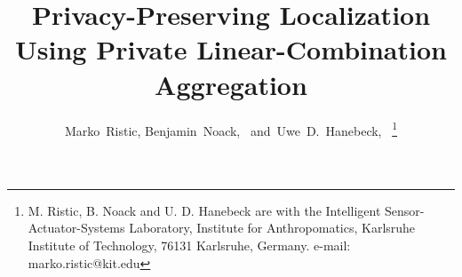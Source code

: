 \documentclass[10pt,letterpaper,oneside,twocolumn,journal]{IEEEtran}
\theoremstyle{definition}
\theoremstyle{definition}
\theoremstyle{remark}
\begin{document}
%
\title{Privacy-Preserving Localization Using Private Linear-Combination Aggregation}
%
%
\author{Marko~Ristic,
        Benjamin~Noack,~
        and~Uwe~D.~Hanebeck,~%
\thanks{M. Ristic, B. Noack and U. D. Hanebeck are with the Intelligent Sensor-Actuator-Systems Laboratory, Institute for Anthropomatics, Karlsruhe Institute of Technology, 76131 Karlsruhe, Germany. e-mail: marko.ristic@kit.edu}}%




\maketitle

% 
%                                                                                             
%                                                                                             
%                                                                                             
% 
\end{document}
